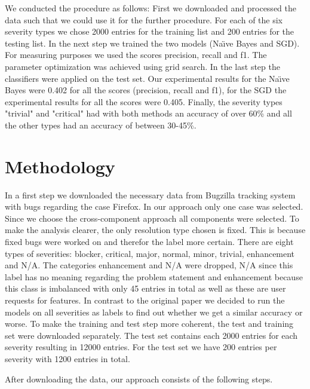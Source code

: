 \documentclass[sigconf,screen]{acmart}
\begin{document}
We conducted the procedure as follows: First we downloaded and processed the data such that we could use it for the further procedure. For each of the six severity types we chose 2000 entries for the training list and 200 entries for the testing list. In the next step we trained the two models (Na{\"\i}ve Bayes and SGD). For measuring purposes we used the scores precision, recall and f1. The parameter optimization was achieved using grid search. In the last step the classifiers were applied on the test set. Our experimental results for the Na{\"\i}ve Bayes were 0.402 for all the scores (precision, recall and f1), for the SGD the experimental results for all the scores were  0.405. Finally, the severity types "trivial" and "critical" had with both methods an accuracy of over 60\% and all the other types had an accuracy of between 30-45\%.

\section{Methodology}
In a first step we downloaded the necessary data from Bugzilla tracking system with bugs regarding the case Firefox. In our approach only one case was selected. Since we choose the cross-component approach all components were selected. To make the analysis clearer, the only resolution type chosen is fixed. This is because fixed bugs were worked on and therefor the label more certain. There are eight types of severities: blocker, critical, major, normal, minor, trivial, enhancement and N/A. The categories enhancement and N/A were dropped, N/A since this label has no meaning regarding the problem statement and enhancement because this class is imbalanced with only 45 entries in total as well as these are user requests for features. In contrast to the original paper we decided to run the models on all severities as labels to find out whether we get a similar accuracy or worse. To make the training and test step more coherent, the test and training set were downloaded separately. The test set contains each 2000 entries for each severity resulting in 12000 entries. For the test set we have 200 entries per severity with 1200 entries in total.

After downloading the data, our approach consists of the following steps.
\end{document}
